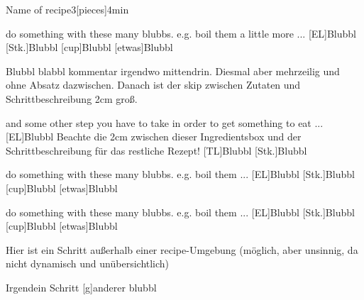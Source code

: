 \documentclass[ngerman,parskip=full]{scrartcl}
\begin{document}
\bigskip
\begin{recipe}{Name of recipe}{3}[pieces]{4min}
  \begin{step}{do something with these many blubbs. e.g. boil them a
      little more ...}
    [EL]{Blubbl}
    [Stk.]{Blubbl}
    [cup]{Blubbl}
    [etwas]{Blubbl}
  \end{step}
  Blubbl blabbl kommentar irgendwo mittendrin. Diesmal aber mehrzeilig
  und ohne Absatz dazwischen.
  Danach ist der skip zwischen Zutaten und Schrittbeschreibung 2cm groß.
  \setlength{\ingredientdescriptionskip}{2cm}
  \begin{step}{and some other step you have to take in order to get
      something to eat ...}
    [EL]{Blubbl}
    Beachte die 2cm zwischen dieser Ingredientsbox und der
    Schrittbeschreibung für das restliche Rezept!
    [TL]{Blubbl}
    [Stk.]{Blubbl}
  \end{step}
  \begin{step}{do something with these many blubbs. e.g. boil them ...}
    [EL]{Blubbl}
    [Stk.]{Blubbl}
    [cup]{Blubbl}
    [etwas]{Blubbl}
  \end{step}
  \begin{step}{do something with these many blubbs. e.g. boil them ...}
    [EL]{Blubbl}
    [Stk.]{Blubbl}
    [cup]{Blubbl}
    [etwas]{Blubbl}
  \end{step}
\end{recipe}

\clearpage
Hier ist ein Schritt außerhalb einer recipe-Umgebung
(möglich, aber unsinnig, da nicht dynamisch und unübersichtlich)
\begin{step}{Irgendein Schritt}
  [g]{anderer blubbl}
\end{step}
\end{document}
